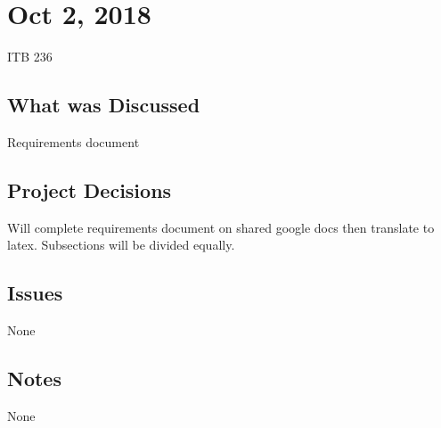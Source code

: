 \documentclass[12pt]{report}
\begin{document}
\section{Oct 2, 2018}
ITB 236

\subsection{What was Discussed}
Requirements document

\subsection{Project Decisions}
Will complete requirements document on shared google docs then translate to latex. Subsections will be divided equally.

\subsection{Issues}
None

\subsection{Notes}
None
\end{document}
